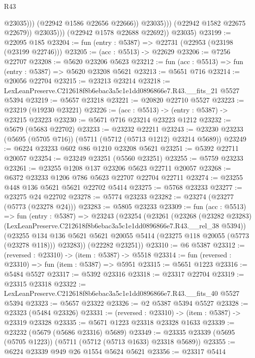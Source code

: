 \begin{lexlean}{R43}
\begin{coremodule}
                              @23035)))
                        (@22942 @1586 @22656 @22666))
                      @23035)))
                (@22942 @1582 @22675 @22679))
              @23035)))
        (@22942 @1578 @22688 @22692))
      @23035)
@23199 := @22095 @185
@23204 := fun (entry : @5387) => @22731 (@22953 (@23198 (@23199 @22746)))
@23205 := (acc : @5513) -> @22629
@23206 := @7256 @22707
@23208 := @5620 @23206 @5623
@23212 := fun (acc : @5513) => fun (entry : @5387) => @5620 @23208 @5621
@23213 := @5651 @716
@23214 := @20056 @22704
@23215 := @23213 @23214
@23218 := LexLeanPreserve.C212618f8b6ebac3a5c1e1dd0896866e7.R43.__fits_21 @5527 @5394
@23219 := @5657 @23218
@23221 := @20820 @22710 @5527
@23223 := @23219 (@19230 @23221)
@23226 := (acc : @5513) -> (entry : @5387) -> @23215 @23223
@23230 := @5671 @716 @23214 @23223 @1212
@23232 := @5679 (@5683 @22702)
@23233 := @23232 @22211
@23243 := @23230 @23233 (@5695 (@5705 @716)) (@5711 (@5712 (@5713 @1212) @23214 @5689))
@23249 := @6224 @23233 @602 @86 @1210 @23208 @5621
@23251 := @5392 @22711 @20057
@23254 := @23249 @23251 (@5560 @23251)
@23255 := @5759 @23233
@23261 := @23255 @1208 @137 @23206 @5623 @22711 @20057
@23268 := @6372 @23233 @1206 @786 @5623 @22707 @22704 @22711
@23274 := @23255 @448 @136 @5621 @5621 @22702 @5414
@23275 := @5768 @23233
@23277 := @23275 @24 @22702
@23278 := @5774 @23233
@23282 := @23274 (@23277 (@5773 (@23278 @24)))
@23283 := @5805 @23233
@23309 := fun (acc : @5513) =>
  fun (entry : @5387) =>
  @23243
    (@23254
      (@23261
        (@23268
          (@23282 @23283)
          (LexLeanPreserve.C212618f8b6ebac3a5c1e1dd0896866e7.R43.__rel_38 @5394))
        (@23255
          @134
          @136
          @5621
          @5621
          @20055
          @5414
          (@23275 @118 @20055 (@5773 (@23278 @118)))
          @23283))
      (@22282 @23251))
@23310 := @6 @5387
@23312 := (reversed : @23310) -> (item : @5387) -> @5518
@23314 := fun (reversed : @23310) => fun (item : @5387) => @5951
@23315 := @5651 @1223
@23316 := @5484 @5527
@23317 := @5392 @23316
@23318 := @23317 @22704
@23319 := @23315 @23318
@23322 := LexLeanPreserve.C212618f8b6ebac3a5c1e1dd0896866e7.R43.__fits_40 @5527 @5394
@23323 := @5657 @23322
@23326 := @2 @5387 @5394 @5527
@23328 := @23323 (@5484 @23326)
@23331 := (reversed : @23310) -> (item : @5387) -> @23319 @23328
@23335 := @5671 @1223 @23318 @23328 @1633
@23339 := @23232 (@5679 (@5686 @23316) @5689)
@23349 := @23335 @23339 (@5695 (@5705 @1223)) (@5711 (@5712 (@5713 @1633) @23318 @5689))
@23355 := @6224 @23339 @949 @26 @1554 @5624 @5621
@23356 := @23317 @5414

\end{coremodule}
\end{lexlean}
